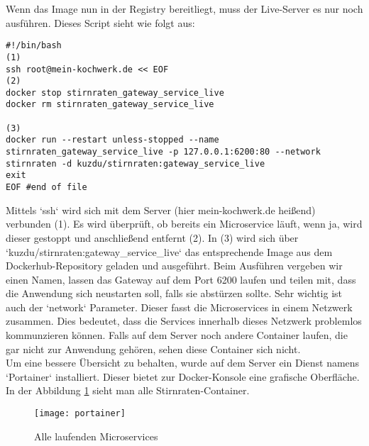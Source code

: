 Wenn das Image nun in der Registry bereitliegt, muss der Live-Server es nur noch ausführen. Dieses Script sieht wie folgt aus:

\begin{verbatim}
#!/bin/bash
(1)
ssh root@mein-kochwerk.de << EOF 
(2)
docker stop stirnraten_gateway_service_live
docker rm stirnraten_gateway_service_live

(3)
docker run --restart unless-stopped --name stirnraten_gateway_service_live -p 127.0.0.1:6200:80 --network stirnraten -d kuzdu/stirnraten:gateway_service_live
exit
EOF #end of file
\end{verbatim}
Mittels `ssh` wird sich mit dem Server (hier mein-kochwerk.de heißend) verbunden (1). Es wird überprüft, ob bereits ein Microservice läuft, wenn ja, wird dieser gestoppt und anschließend entfernt (2). In (3) wird sich über `kuzdu/stirnraten:gateway\_service\_live` das entsprechende Image aus dem Dockerhub-Repository geladen und ausgeführt. Beim Ausführen vergeben wir einen Namen, lassen das Gateway auf dem Port 6200 laufen und teilen mit, dass die Anwendung sich neustarten soll, falls sie abstürzen sollte. Sehr wichtig ist auch der `network` Parameter. Dieser fasst die Microservices in einem Netzwerk zusammen. Dies bedeutet, dass die Services innerhalb dieses Netzwerk problemlos kommunzieren können. Falls auf dem Server noch andere Container laufen, die gar nicht zur Anwendung gehören, sehen diese Container sich nicht.\\

Um eine bessere Übersicht zu behalten, wurde auf dem Server ein Dienst namens `Portainer` installiert. Dieser bietet zur Docker-Konsole eine grafische Oberfläche. In der Abbildung \ref{fig:portainer} sieht man alle Stirnraten-Container.

\begin{figure}[ht]
	\centering
	\texttt{[image: portainer]}
	\caption[Alle laufenden Microservices] {Alle laufenden Microservices}
	\label{fig:portainer}
\end{figure} 





